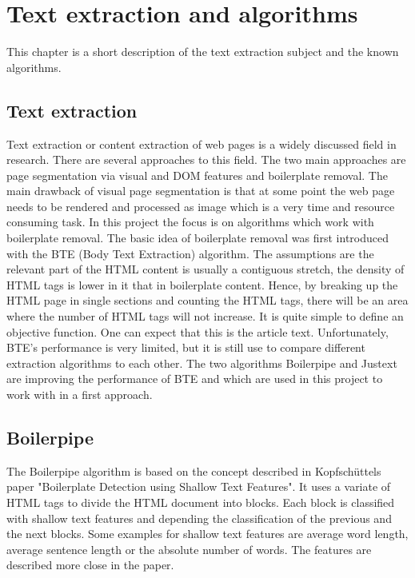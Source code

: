 \section{Text extraction and algorithms}

 This chapter is a short description of the text extraction subject and the known algorithms.

 \subsection{Text extraction}

 Text extraction or content extraction of web pages is a widely discussed field in research. There are several approaches to this field. The two main approaches are page segmentation via visual and DOM features and boilerplate removal. The main drawback of visual page segmentation is that at some point the web page needs to be rendered and processed as image which is a very time and resource consuming task. In this project the focus is on algorithms which work with boilerplate removal.
 The basic idea of boilerplate removal was first introduced with the BTE (Body Text Extraction) algorithm. The assumptions are the relevant part of the HTML content is usually a contiguous stretch, the density of HTML tags is lower in it that in boilerplate content. Hence, by breaking up the HTML page in single sections and counting the HTML tags, there will be an area where the number of HTML tags will not increase. It is quite simple to define an objective function. One can expect that this is the article text. Unfortunately, BTE's performance is very limited, but it is still use to compare different extraction algorithms to each other. The two algorithms Boilerpipe and Justext are improving the performance of BTE and which are used in this project to work with in a first approach.

 \subsection{Boilerpipe}

 The Boilerpipe algorithm is based on the concept described in Kopfschüttels paper "Boilerplate Detection using Shallow Text Features". It uses a variate of HTML tags  to divide the HTML document into blocks. Each block is classified with shallow text features and depending the classification of the  previous and the next blocks. Some examples for shallow text features are average word length, average sentence length or the absolute number of words. The features are described more close in the paper.

